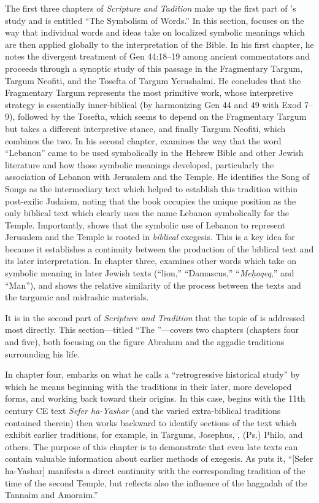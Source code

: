  The first three chapters of \emph{Scripture and Tadition} make up the first part of \vermes's study and is entitled ``The Symbolism of Words.'' In this section, \vermes focuses on the way that individual words and ideas take on localized symbolic meanings which are then applied globally to the interpretation of the Bible. In his first chapter, he notes the divergent treatment of Gen 44:18--19 among ancient commentators and proceeds through a synoptic study of this passage in the Fragmentary Targum, Targum Neofiti, and the Tosefta of Targum Yerushalmi. He concludes that the Fragmentary Targum represents the most primitive work, whose interpretive strategy is essentially inner-biblical (by harmonizing Gen 44 and 49 with Exod 7--9), followed by the Tosefta, which seems to depend on the Fragmentary Targum but takes a different interpretive stance, and finally Targum Neofiti, which combines the two. In his second chapter, \vermes examines the way that the word ``Lebanon'' came to be used symbolically in the Hebrew Bible and other Jewish literature and how those symbolic meanings developed, particularly the association of Lebanon with Jerusalem and the Temple. He identifies the Song of Songs as the intermediary text which helped to establish this tradition within post-exilic Judaism, noting that the book occupies the unique position as the only biblical text which clearly uses the name Lebanon symbolically for the Temple. Importantly, \vermes shows that the symbolic use of Lebanon to represent Jerusalem and the Temple is rooted in \emph{biblical} exegesis. This is a key idea for \vermes because it establishes a continuity between the production of the biblical text and its later interpretation. In chapter three, \vermes examines other words which take on symbolic meaning in later Jewish texts (``lion,'' ``Damascus,'' ``\emph{Meḥoqeq},'' and ``Man''), and shows the relative similarity of the process between the \dss texts and the targumic and midrashic materials. 

 It is in the second part of \emph{Scripture and Tradition} that the topic of \RwB is addressed most directly. This section---titled ``The \RwB''---covers two chapters (chapters four and five), both focusing on the figure Abraham and the aggadic traditions surrounding his life. 

 In chapter four, \vermes embarks on what he calls a ``retrogressive historical study'' by which he means beginning with the traditions in their later, more developed forms, and working back toward their origins. In this case, \vermes begins with the 11th century CE text \emph{Sefer ha-Yashar} (and the varied extra-biblical traditions contained therein) then works backward to identify sections of the text which exhibit earlier traditions, for example, in Targums, Josephus, \jub, (Ps.) Philo, and others. The purpose of this chapter is to demonstrate that even late texts can contain valuable information about earlier methods of exegesis. As \vermes puts it, ``{[}Sefer ha-Yashar{]} manifests a direct continuity with the corresponding tradition of the time of the second Temple, but reflects also the influence of the haggadah of the Tannaim and Amoraim.''\autocite[95]{vermes1961} 

